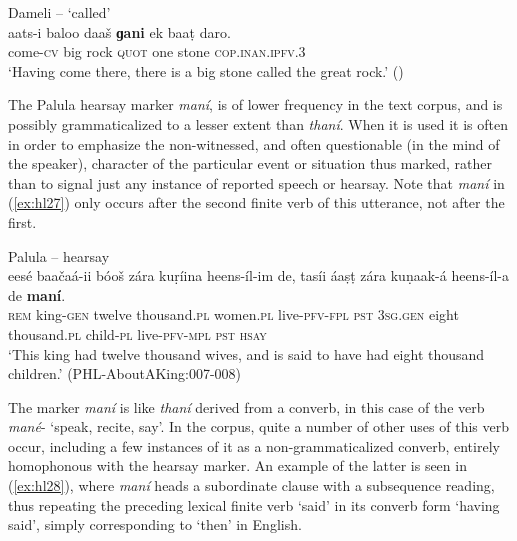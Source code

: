\documentclass[output=paper]{langsci/langscibook}
\begin{document}
\begin{exe}
\ex Dameli – ‘called’ \label{ex:hl26}\\
	\gll aats-i baloo daaš \textbf{ɡani} ek baaṭ daro.\\
	come-\textsc{cv} big rock \textsc{quot} one stone \textsc{cop}.\textsc{inan}.\textsc{ipfv}.3\\
	\trans ‘Having come there, there is a big stone called the great rock.’ (\citealt[177]{Perder2013}) 
\end{exe}

The Palula hearsay marker \textit{maní}, is of lower frequency in the text corpus, and is possibly grammaticalized to a lesser extent than \textit{thaní}. When it is used it is often in order to emphasize the non-witnessed, and often questionable (in the mind of the speaker), character of the particular event or situation thus marked, rather than to signal just any instance of reported speech or hearsay. Note that \textit{maní} in ‎(\ref{ex:hl27}) only occurs after the second finite verb of this utterance, not after the first.

\begin{exe}
\ex Palula -- hearsay \label{ex:hl27}\\
	\gll eesé baačaá-ii bóoš zára kuṛíina heens-íl-im de, tasíi áaṣṭ zára kuṇaak-á heens-íl-a de \textbf{maní}.\\
	\textsc{rem} king-\textsc{gen} twelve thousand.\textsc{pl} women.\textsc{pl} live-\textsc{pfv}-\textsc{fpl} \textsc{pst} 3\textsc{sg}.\textsc{gen} eight thousand.\textsc{pl} child-\textsc{pl} live-\textsc{pfv}-\textsc{mpl} \textsc{pst} \textsc{hsay}\\
	\trans ‘This king had twelve thousand wives, and is said to have had eight thousand children.’ (PHL-AboutAKing:007-008) 
\end{exe}

The marker \textit{maní} is like \textit{thaní} derived from a converb, in this case of the verb \textit{mané}- ‘speak, recite, say’. In the corpus, quite a number of other uses of this verb occur, including a few instances of it as a non-grammaticalized converb, entirely homophonous with the hearsay marker. An example of the latter is seen in ‎(\ref{ex:hl28}), where \textit{maní} heads a subordinate clause with a subsequence reading, thus repeating the preceding lexical finite verb ‘said’ in its converb form ‘having said’, simply corresponding to ‘then’ in English.
\end{document}
